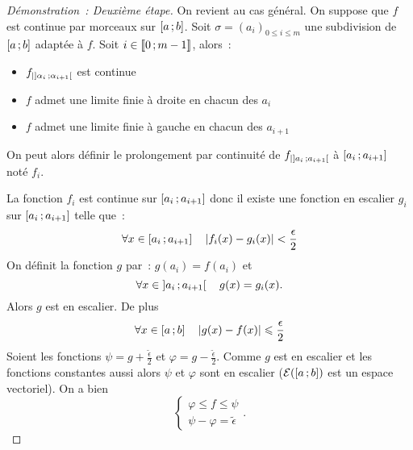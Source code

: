 \begin{proof}[Démonstration~: Deuxième étape]
  On revient au cas général. On suppose que \(f\) est continue par morceaux sur 
  \(\left[ a \, ; {} b \right]\). Soit \(\sigma=(a_i)_{0 \leqslant i \leqslant m}\) une 
  subdivision de \(\left[ a \, ; {} b \right]\) adaptée à \(f\). Soit \(i \in 
  \mathopen{\llbracket}0\mathclose{}\mathpunct{};m-1\mathclose{\rrbracket}\), alors~:
  \begin{itemize}
    \item \(f_{|\left] \alpha_i \, ; {} \alpha_{i+1} \right[}\) est continue
    \item \(f\) admet une limite finie à droite en chacun des \(a_i\)
    \item \(f\) admet une limite finie à gauche en chacun des \(a_{i+1}\)
  \end{itemize}
  On peut alors définir le prolongement par continuité de 
  \(f_{|\left] a_i \, ; {} a_{i+1} \right[}\) à \(\left[ a_i \, ; {} a_{i+1} \right]\) noté 
  \(f_i\).

  La fonction \(f_i\) est continue sur \(\left[ a_i \, ; {} a_{i+1} \right]\) donc il 
  existe une fonction en escalier \(g_i\) sur \(\left[ a_i \, ; {} a_{i+1} \right]\) 
  telle que~:
  \begin{equation}
    \forall x \in \left[ a_i \, ; {} a_{i+1} \right] \quad \left\lvert f_i(x)-g_i(x)\right\rvert < 
    \frac{\epsilon}{2}
  \end{equation}
  On définit la fonction \(g\) par~: \(g(a_i)=f(a_i)\) et
  \begin{equation}
    \forall x \in \left] a_i \, ; {} a_{i+1} \right[ \quad g(x)=g_i(x).
  \end{equation}
  Alors \(g\) est en escalier. De plus
  \begin{equation}
    \forall x \in \left[ a \, ; {} b \right] \quad \left\lvert g(x)-f(x)\right\rvert \leqslant 
    \frac{\epsilon}{2}
  \end{equation}
  Soient les fonctions \(\psi=g + \frac{\tilde{\epsilon}}{2}\) et \(\varphi=g - 
  \frac{\tilde{\epsilon}}{2}\). Comme \(g\) est en escalier et les fonctions 
  constantes aussi alors \(\psi\) et \(\varphi\) sont en escalier 
  (\(\mathcal{E}(\left[ a \, ; {} b \right])\) est un espace vectoriel). On a bien
  \begin{equation}
    \begin{cases}
      \varphi \leqslant f \leqslant \psi \\
      \psi-\varphi=\tilde{\epsilon}
    \end{cases}.
  \end{equation}
\end{proof}

